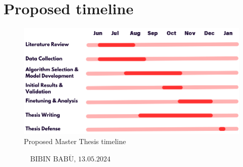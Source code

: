 \documentclass[12pt,twoside,a4paper,parskip]{scrbook} %
\def\BaAuthor{Bibin Babu}
\def\SubmitDate{13.05.2024}
\def\ShowBaAuthor{\BaAuthor}
\def\ShowBaAuthor{BIBIN BABU}
\begin{document}
\let\cleardoublepage\clearpage

\chapter{Proposed timeline}\label{ch:Proposed timeline}

\begin{figure}[H]
    \centering
    \includegraphics[width=0.9\linewidth]{figures/Thesis timeline.png} %
    \caption{Proposed Master Thesis timeline}
    \label{fig:enter-label}
\end{figure}

\FloatBarrier

\printbibliography

\vspace{20pt}
\begin{flushright}
$\overline{~~~~~~~~~~~~~~~~~\mbox{\ShowBaAuthor, \SubmitDate}~~~~~~~~~~~~~~~~~}$
\end{flushright}
\end{document}
